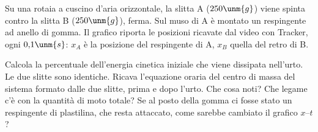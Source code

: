 \documentclass[10pt]{article}
\begin{document}
Su una rotaia a cuscino d'aria orizzontale, la slitta A ($250\unm{g}$) viene spinta contro la
slitta B ($250\unm{g}$), ferma. Sul muso di A è montato un respingente ad anello di gomma. Il
grafico riporta le posizioni ricavate dal video con Tracker, ogni $0{,}1\unm{s}$: $x_A$ è la
posizione del respingente di A, $x_B$ quella del retro di B.

\begin{center}
\end{center}

\begin{parts}
  \itemx Calcola la percentuale dell'energia cinetica iniziale che viene dissipata nell'urto.
  \itemx Le due slitte sono identiche. Ricava l'equazione oraria del centro di massa del sistema
    formato dalle due slitte, prima e dopo l'urto. Che cosa noti? Che legame c'è con la quantità di
    moto totale?
  \itemx Se al posto della gomma ci fosse stato un respingente di plastilina, che resta attaccato,
    come sarebbe cambiato il grafico $x$--$t$?
\end{parts}
\end{document}
